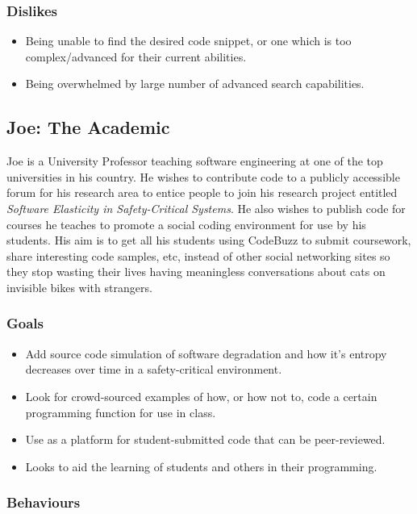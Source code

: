 \documentclass{sig-alt-release2}
\begin{document}
\subsubsection{Dislikes}

\begin{itemize}
\item Being unable to find the desired code snippet, or one which is
too complex/advanced for their current abilities.
\item Being overwhelmed by large number of advanced search capabilities.
\end{itemize}

\subsection{Joe: The Academic}

Joe is a University Professor teaching software engineering at
one of the top universities in his country. He wishes to contribute
code to a publicly accessible forum for his research area to entice
people to join his research project entitled
\textit{Software Elasticity in Safety-Critical Systems}. He also wishes
to publish code for courses he teaches to promote a social coding
environment for use by his students. His aim is to get all his students
using CodeBuzz to submit coursework, share interesting code samples,
etc, instead of other social networking sites so they stop
wasting their lives having meaningless conversations about cats on
invisible bikes with strangers.

\subsubsection{Goals}

\begin{itemize}
\item Add source code simulation of software degradation and how it's
entropy decreases over time in a safety-critical environment.
\item Look for crowd-sourced examples of how, or how not to, code a certain
programming function for use in class.
\item Use as a platform for student-submitted code that can be peer-reviewed.
\item Looks to aid the learning of students and others in their programming.
\end{itemize}

\subsubsection{Behaviours}
\end{document}
